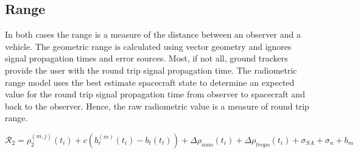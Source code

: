\subsection{Range}

 \cite{DatSim:08} In both cases the range is a
measure of the distance between an observer and a vehicle.  The
geometric range is calculated using vector geometry and ignores
signal propagation times and error sources.  Most, if not all,
ground trackers provide the user with the round trip signal
propagation time.  The radiometric range model uses the best
estimate spacecraft state to determine an expected value for the
round trip signal propagation time from observer to spacecraft and
back to the observer.  Hence, the raw radiometric value is a measure
of round trip range.


\begin{equation}
    \mathcal{R}_2 = \rho^{(m,j)}_2(t_i) +c\left(b_r^{(m)}(t_i) - b_t(t_t)\right)
     + \Delta \rho_{iono}(t_i) + \Delta \rho_{tropo}(t_i)
      + \sigma_{SA} + \sigma_n + b_m
\end{equation}




